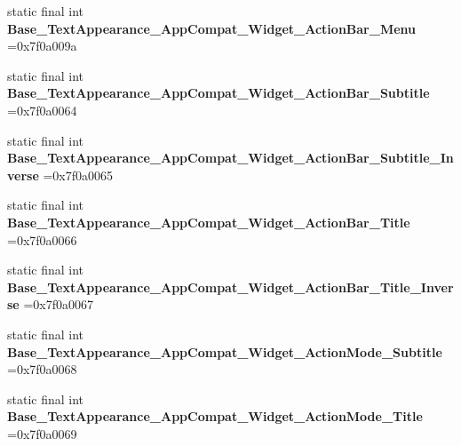 \begin{DoxyCompactItemize}
\item 
\mbox{\label{classproject4_1_1xaria_1_1R_1_1style_ae360a4c153a608c986bf5464321ab954}} 
static final int {\bfseries Base\+\_\+\+Text\+Appearance\+\_\+\+App\+Compat\+\_\+\+Widget\+\_\+\+Action\+Bar\+\_\+\+Menu} =0x7f0a009a
\item 
\mbox{\label{classproject4_1_1xaria_1_1R_1_1style_ad1a391dfc9d5946394531a7aeca48135}} 
static final int {\bfseries Base\+\_\+\+Text\+Appearance\+\_\+\+App\+Compat\+\_\+\+Widget\+\_\+\+Action\+Bar\+\_\+\+Subtitle} =0x7f0a0064
\item 
\mbox{\label{classproject4_1_1xaria_1_1R_1_1style_a7db7e2a7c3b0e623538e1277ccdd357a}} 
static final int {\bfseries Base\+\_\+\+Text\+Appearance\+\_\+\+App\+Compat\+\_\+\+Widget\+\_\+\+Action\+Bar\+\_\+\+Subtitle\+\_\+\+Inverse} =0x7f0a0065
\item 
\mbox{\label{classproject4_1_1xaria_1_1R_1_1style_a542efca618ef5e227a867627961664d3}} 
static final int {\bfseries Base\+\_\+\+Text\+Appearance\+\_\+\+App\+Compat\+\_\+\+Widget\+\_\+\+Action\+Bar\+\_\+\+Title} =0x7f0a0066
\item 
\mbox{\label{classproject4_1_1xaria_1_1R_1_1style_a5e2f5963ec648da0bee66deacc9c9032}} 
static final int {\bfseries Base\+\_\+\+Text\+Appearance\+\_\+\+App\+Compat\+\_\+\+Widget\+\_\+\+Action\+Bar\+\_\+\+Title\+\_\+\+Inverse} =0x7f0a0067
\item 
\mbox{\label{classproject4_1_1xaria_1_1R_1_1style_a01330af4874d32849bdf8014f849261c}} 
static final int {\bfseries Base\+\_\+\+Text\+Appearance\+\_\+\+App\+Compat\+\_\+\+Widget\+\_\+\+Action\+Mode\+\_\+\+Subtitle} =0x7f0a0068
\item 
\mbox{\label{classproject4_1_1xaria_1_1R_1_1style_a2e0e5e5c0ac6f5afe45295874cba5e39}} 
static final int {\bfseries Base\+\_\+\+Text\+Appearance\+\_\+\+App\+Compat\+\_\+\+Widget\+\_\+\+Action\+Mode\+\_\+\+Title} =0x7f0a0069
\item 
\mbox{\label{classproject4_1_1xaria_1_1R_1_1style_a38db09d627f60a39f78640d5012d53b1}} 

\end{DoxyCompactItemize}
